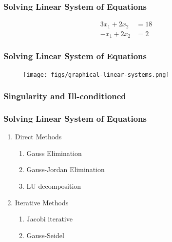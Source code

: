 \documentclass[notes]{beamer}
\begin{document}
\begin{frame}
	\frametitle{Solving Linear System of Equations}
	\begin{align*}
		3 x_1 + 2 x_2 & = 18 \\
		-x_1 + 2 x_2 & = 2
	\end{align*}
\end{frame}

\begin{frame}
	\frametitle{Solving Linear System of Equations}
	\begin{figure}[ht]
		\centering
		\texttt{[image: figs/graphical-linear-systems.png]}
	\end{figure}
\end{frame}

\begin{frame}
	\frametitle{Singularity and Ill-conditioned}
\end{frame}


\begin{frame}
	\frametitle{Solving Linear System of Equations}
	\begin{enumerate}
		\item Direct Methods
		\begin{enumerate}
			\item Gauss Elimination
			\item Gauss-Jordan Elimination
			\item LU decomposition
		\end{enumerate}
		\item Iterative Methods
		\begin{enumerate}
			\item Jacobi iterative
			\item Gauss-Seidel
		\end{enumerate}
	\end{enumerate}
\end{frame}
\end{document}
